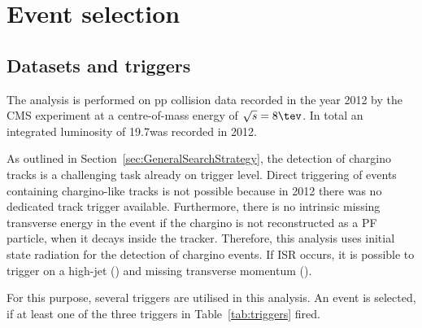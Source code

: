 \FloatBarrier
\chapter{Event selection}
\label{sec:EventSelection}
\section{Datasets and triggers}
\label{sec:DatasetsAndTriggers}

The analysis is performed on pp collision data recorded in the year 2012 by the CMS experiment at a centre-of-mass energy of $\sqrt{s}=8\tev$.
In total an integrated luminosity of 19.7\fbinv was recorded in 2012.

As outlined in Section~\ref{sec:GeneralSearchStrategy}, the detection of chargino tracks is a challenging task already on trigger level.
Direct triggering of events containing chargino-like tracks is not possible because in 2012 there was no dedicated track trigger available.
Furthermore, there is no intrinsic missing transverse energy in the event if the chargino is not reconstructed as a PF particle, \eg when it decays inside the tracker.
Therefore, this analysis uses initial state radiation for the detection of chargino events.
If ISR occurs, it is possible to trigger on a high-\pt jet (\ptfirstjet) and missing transverse momentum (\met).

For this purpose, several triggers are utilised in this analysis.
An event is selected, if at least one of the three triggers in Table~\ref{tab:triggers} fired.
%
\renewcommand{\arraystretch}{1.5}
\begin{table}[!hbt]
\centering
\caption{\met and \met+ jet triggers used in this analysis together with the corresponding recorded integrated luminosity during the time when they were in place.}
\label{tab:triggers}
\end{table}  

